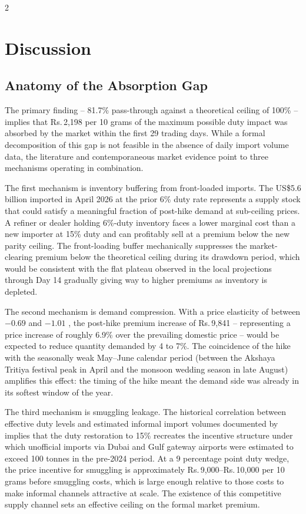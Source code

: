 \documentclass[12pt]{article}
\begin{document}
\begin{multicols}{2}
\section{Discussion}
\label{sec:discussion}

\subsection*{Anatomy of the Absorption Gap}

The primary finding -- 81.7\% pass-through against a theoretical ceiling of 100\% -- implies that Rs.\,2,198 per 10 grams of the maximum possible duty impact was absorbed by the market within the first 29 trading days. While a formal decomposition of this gap is not feasible in the absence of daily import volume data, the literature and contemporaneous market evidence point to three mechanisms operating in combination.

The first mechanism is inventory buffering from front-loaded imports. The US\$5.6 billion imported in April 2026 at the prior 6\% duty rate represents a supply stock that could satisfy a meaningful fraction of post-hike demand at sub-ceiling prices. A refiner or dealer holding 6\%-duty inventory faces a lower marginal cost than a new importer at 15\% duty and can profitably sell at a premium below the new parity ceiling. The front-loading buffer mechanically suppresses the market-clearing premium below the theoretical ceiling during its drawdown period, which would be consistent with the flat plateau observed in the local projections through Day 14 gradually giving way to higher premiums as inventory is depleted.

The second mechanism is demand compression. With a price elasticity of between $-0.69$ and $-1.01$ \citep{KanjilalGhosh2014}, the post-hike premium increase of Rs.\,9,841 -- representing a price increase of roughly 6.9\% over the prevailing domestic price -- would be expected to reduce quantity demanded by 4 to 7\%. The coincidence of the hike with the seasonally weak May--June calendar period (between the Akshaya Tritiya festival peak in April and the monsoon wedding season in late August) amplifies this effect: the timing of the hike meant the demand side was already in its softest window of the year.

The third mechanism is smuggling leakage. The historical correlation between effective duty levels and estimated informal import volumes documented by \citet{GoldSmuggling2024} implies that the duty restoration to 15\% recreates the incentive structure under which unofficial imports via Dubai and Gulf gateway airports were estimated to exceed 100 tonnes in the pre-2024 period. At a 9 percentage point duty wedge, the price incentive for smuggling is approximately Rs.\,9,000--Rs.\,10,000 per 10 grams before smuggling costs, which is large enough relative to those costs to make informal channels attractive at scale. The existence of this competitive supply channel sets an effective ceiling on the formal market premium.


\end{multicols}
\end{document}
